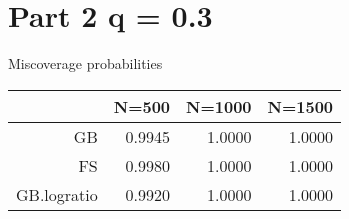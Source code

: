 \section*{Part 2 q = 0.3}


Miscoverage probabilities

\begin{tabular}{rrrr}
  \hline
 & N=500 & N=1000 & N=1500 \\ 
  \hline
GB & 0.9945 & 1.0000 & 1.0000 \\ 
  FS & 0.9980 & 1.0000 & 1.0000 \\ 
  GB.logratio & 0.9920 & 1.0000 & 1.0000 \\ 
   \hline
\end{tabular}
\vspace{0.2in}
